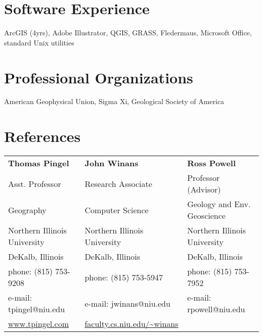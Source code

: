 \documentclass{cv_TOH}
\begin{document}
\section{Software Experience}
ArcGIS (4yrs), Adobe Illustrator, QGIS, GRASS, Fledermaus, Microsoft Office, standard Unix utilities

\section{Professional Organizations}
American Geophysical Union, Sigma Xi, Geological Society of America

\section{References}
\begin{tabular}{@{}p{6cm}p{6cm}p{6cm}}
 \textbf{Thomas Pingel}            & \textbf{John Winans}              &   \textbf{Ross Powell}           \\
 Asst. Professor                   &  Research Associate               &   Professor (Advisor)            \\ 
 Geography                         &  Computer Science                 &   Geology and Env. Geoscience    \\
 Northern Illinois University      &  Northern Illinois University     &   Northern Illinois University   \\ 
 DeKalb, Illinois                  &  DeKalb, Illinois                 &   DeKalb, Illinois               \\
 phone: (815) 753-9208             &  phone: (815) 753-5947            &   phone: (815) 753-7952          \\
 e-mail: tpingel@niu.edu           &  e-mail: jwinans@niu.edu          &   e-mail: rpowell@niu.edu        \\
 \url{www.tpingel.com}             &  \url{faculty.cs.niu.edu/~winans} &                                  \\     
\end{tabular}
\end{document}
